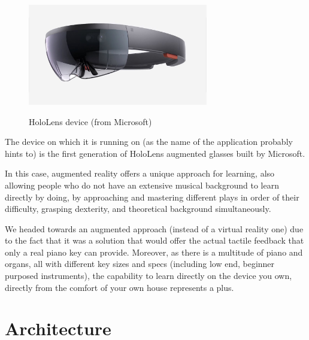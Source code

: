 \documentclass[12 pct]{report}
\begin{document}
\begin{figure}[H]
\includegraphics[width=0.7\textwidth]{hololens}
\centering
\label{fig:hololens}
\caption{HoloLens device (from Microsoft)}
\end{figure}

The device on which it is running on (as the name of the application probably hints to) is the first generation of HoloLens augmented glasses built by Microsoft.


In this case, augmented reality offers a unique approach for learning, also allowing people who do not have an extensive musical background to learn directly by doing, by approaching and mastering different plays in order of their difficulty, grasping dexterity, and theoretical background simultaneously.

We headed towards an augmented approach (instead of a virtual reality one) due to the fact that it was a solution that would offer the actual tactile feedback that only a real piano key can provide. Moreover, as there is a multitude of piano and organs, all with different key sizes and specs (including low end, beginner purposed instruments), the capability to learn directly on the device you own, directly from the comfort of your own house represents a plus.

\section{Architecture}
\end{document}
